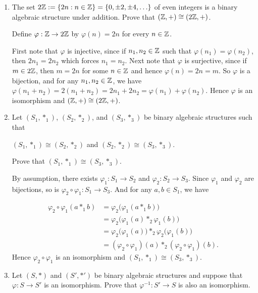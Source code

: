 \documentclass[11pt,fleqn,dvipsnames,usenames]{article}
\begin{document}
\begin{enumerate}[1.]
\item The set $2\mathbb{Z} := \left\{2n:n\in\mathbb{Z}\right\} = \left\{0, \pm 2, \pm 4,\ldots\right\}$ of even integers is a binary algebraic structure under addition.  Prove that $(\mathbb{Z},+)\cong (2\mathbb{Z},+)$.
\vsmsp

\solution Define $\varphi:\mathbb{Z}\to 2\mathbb{Z}$ by $\varphi(n) = 2n$ for every $n\in \mathbb{Z}$.
\vsmsp

First note that $\varphi$ is injective, since if $n_{1},n_{2}\in\mathbb{Z}$ such that $\varphi(n_{1}) = \varphi(n_{2})$, then $2n_{1} = 2n_{2}$ which forces $n_{1} = n_{2}$.  Next note that $\varphi$ is surjective, since if $m\in 2\mathbb{Z}$, then $m = 2n$ for some $n\in \mathbb{Z}$ and hence $\varphi(n) = 2n = m$.  So $\varphi$ is a bijection, and for any $n_{1},n_{2}\in \mathbb{Z}$, we have $\varphi(n_{1} + n_{2}) = 2(n_{1} + n_{2}) = 2n_{1} + 2n_{2} = \varphi(n_{1}) + \varphi(n_{2})$.  Hence $\varphi$ is an isomorphism and $(\mathbb{Z},+)\cong (2\mathbb{Z},+)$.
%
\item Let $(S_{1},*_{1})$, $(S_{2}, *_{2})$, and $(S_{3}, *_{3})$ be binary algebraic structures such that
\begin{center}
$(S_{1},*_{1})\cong(S_{2},*_{2})$ and $(S_{2},*_{2})\cong(S_{3},*_{3})$.
\end{center}
Prove that $(S_{1},*_{1})\cong(S_{3},*_{3})$.
\vsmsp

\solution By assumption, there exists $\varphi_{1}:S_{1}\to S_{2}$ and $\varphi_{2}:S_{2}\to S_{3}$.  Since $\varphi_{1}$ and $\varphi_{2}$ are bijections, so is $\varphi_{2}\circ \varphi_{1}:S_{1}\to S_{3}$.  And for any $a,b\in S_{1}$, we have

\begin{align*}
\varphi_{2}\circ \varphi_{1}(a *_{1} b) &= \varphi_{2}\big(\varphi_{1}(a*_{1}b)\big)\\
&= \varphi_{2}\big(\varphi_{1}(a)*_{2}\varphi_{1}(b)\big)\\
&= \varphi_{2}\big(\varphi_{1}(a)\big)*_{2} \varphi_{2}\big(\varphi_{1}(b)\big)\\
&= (\varphi_{2}\circ\varphi_{1})(a)*_{2}(\varphi_{2}\circ \varphi_{1})(b).
\end{align*}
Hence $\varphi_{2}\circ \varphi_{1}$ is an isomorphism and $(S_{1},*_{1})\cong(S_{3},*_{3})$.
%

\item Let $(S,*)$ and $(S',*')$ be binary algebraic structures and suppose that $\varphi:S\to S'$ is an isomorphism.  Prove that $\varphi^{-1}:S'\to S$ is also an isomorphism.
\vsmsp


\end{enumerate}
\end{document}
